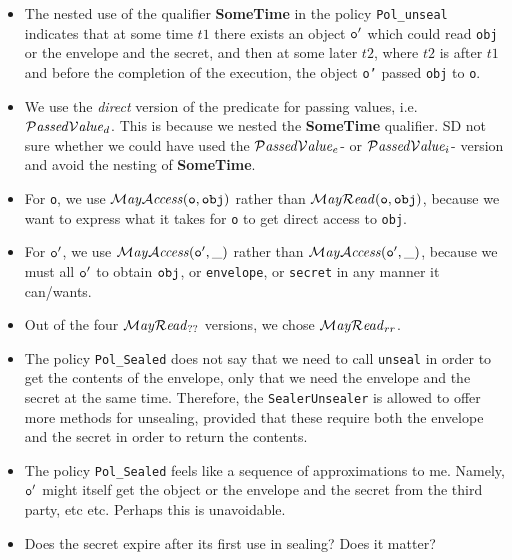 \documentclass{llncs}
\newcommand{\prg}[1]{{\mbox{\tt{#1}}}}
\begin{document}
 \begin{itemize}
 \item The nested use of the qualifier {\bf SomeTime} in the policy \prg{Pol\_unseal} indicates that at some time $t1$ there exists an object $\prg{o}'$ which could read  \prg{obj} or the envelope and the secret, and then at some later  $t2$, where $t2$ is after $t1$ and before the completion of the execution,  the object \prg{o'} passed \prg{obj} to \prg{o}. 
 \item
We use the {\em direct} version of the predicate for passing values, i.e. $\mathcal{P}\textrm{\textit{assed}}{\mathcal{V}}\textrm{\textit{alue}}_d$. This is because we nested the {\bf SomeTime} qualifier. SD not sure whether we could have used the $\mathcal{P}\textrm{\textit{assed}}{\mathcal{V}}\textrm{\textit{alue}}_e$- or $\mathcal{P}\textrm{\textit{assed}}{\mathcal{V}}\textrm{\textit{alue}}_i$- version and avoid the nesting of {\bf SomeTime}.
 \item
 For \prg{o}, we use $\MayAccess(\prg{o},\prg{obj})$  rather than $\MayRead(\prg{o},\prg{obj})$, because we want to express what it takes for \prg{o}  to get direct access to \prg{obj}.
 \item
 For $\prg{o}'$, we use $\MayAccess(\prg{o}',\_)$ rather than $\MayAccess(\prg{o}',\_)$, because we must all $\prg{o}'$ to obtain $\prg{obj}$, or \prg{envelope}, or \prg{secret} in any manner it can/wants.
 \item
 Out of the four $\mathcal{M}\textrm{\textit{ay}}{\mathcal{R}}\textrm{\textit{ead}}_{??}$ versions, we chose   $\mathcal{M}\textrm{\textit{ay}}{\mathcal{R}}\textrm{\textit{ead}}_{rr}$.
 
 \item
 The policy \prg{Pol\_Sealed} does not say that we need to call \prg{unseal} in order to get the contents of the envelope, only that we need the envelope and the secret at the same time. Therefore, the \prg{SealerUnsealer} is allowed to offer more methods for unsealing, provided that these require both the envelope and the secret in order to return the contents.
 
 \item
 The policy \prg{Pol\_Sealed} feels like a sequence of approximations to me. Namely, $\prg{o}'$ might itself get the object or the envelope and the secret from the third party, etc etc. Perhaps this is unavoidable.
 
 \item
 Does the secret expire after its first use in sealing? Does it matter?
 \end{itemize}
 

 
\setlength{\bibsep}{0.0pt}


%
\end{document}
